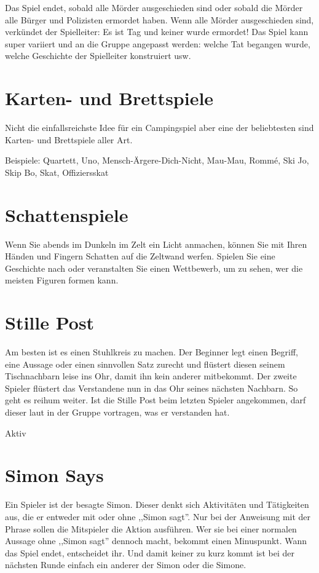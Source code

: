 \documentclass[a4paper]{report}
\begin{document}
Das Spiel endet, sobald alle Mörder ausgeschieden sind oder sobald die Mörder alle Bürger und Polizisten ermordet haben. Wenn alle Mörder ausgeschieden sind, verkündet der Spielleiter: Es ist Tag und keiner wurde ermordet! Das Spiel kann super variiert und an die Gruppe angepasst werden: welche Tat begangen wurde, welche Geschichte der Spielleiter konstruiert usw.

\section*{Karten- und Brettspiele}
Nicht die einfallsreichste Idee für ein Campingspiel aber eine der beliebtesten sind Karten- und Brettspiele aller Art.

Beispiele: Quartett, Uno, Mensch-Ärgere-Dich-Nicht, Mau-Mau, Rommé, Ski Jo, Skip Bo, Skat, Offiziersskat

\section*{Schattenspiele}
Wenn Sie abends im Dunkeln im Zelt ein Licht anmachen, können Sie mit Ihren Händen und Fingern Schatten auf die Zeltwand werfen. Spielen Sie eine Geschichte nach oder veranstalten Sie einen Wettbewerb, um zu sehen, wer die meisten Figuren formen kann.

\section*{Stille Post}
Am besten ist es einen Stuhlkreis zu machen. Der Beginner legt einen Begriff, eine Aussage oder einen sinnvollen Satz zurecht und flüstert diesen seinem Tischnachbarn leise ins Ohr, damit ihn kein anderer mitbekommt. Der zweite Spieler flüstert das Verstandene nun in das Ohr seines nächsten Nachbarn. So geht es reihum weiter. Ist die Stille Post beim letzten Spieler angekommen, darf dieser laut in der Gruppe vortragen, was er verstanden hat.

\noindent\makebox[\linewidth]{\rule{\paperwidth}{0.4pt}}
\begin{center}%
    \huge Aktiv
\end{center}

\section*{Simon Says}
Ein Spieler ist der besagte Simon. Dieser denkt sich Aktivitäten und Tätigkeiten aus, die er entweder mit oder ohne ,,Simon sagt''.  Nur bei der Anweisung mit der Phrase sollen die Mitspieler die Aktion ausführen. Wer sie bei einer normalen Aussage ohne ,,Simon sagt'' dennoch macht, bekommt einen Minuspunkt. Wann das Spiel endet, entscheidet ihr. Und damit keiner zu kurz kommt ist bei der nächsten Runde einfach ein anderer der Simon oder die Simone.
\end{document}
